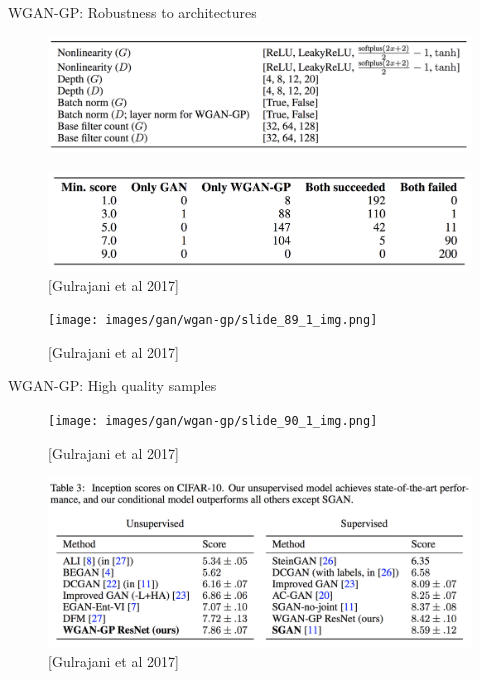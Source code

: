 \begin{frame}[allowframebreaks]{WGAN-GP: Robustness to architectures}
    \begin{figure}
        \centering
        \includegraphics[height=0.8\textheight, width=1.05\textwidth, keepaspectratio]{images/gan/wgan-gp/slide_88_1_img.png}
    \end{figure}
    \begin{figure}
        \centering
        \includegraphics[height=0.8\textheight, width=1.05\textwidth, keepaspectratio]{images/gan/wgan-gp/slide_88_2_img.png}
        \caption*{[Gulrajani et al 2017]}
    \end{figure}

    \framebreak

    \begin{figure}
        \centering
        \texttt{[image: images/gan/wgan-gp/slide\_89\_1\_img.png]}
        \caption*{[Gulrajani et al 2017]}
    \end{figure}
\end{frame}


\begin{frame}[allowframebreaks]{WGAN-GP: High quality samples}
    \begin{figure}
        \centering
        \texttt{[image: images/gan/wgan-gp/slide\_90\_1\_img.png]}
        \caption*{[Gulrajani et al 2017]}
    \end{figure}

    \framebreak

    \begin{figure}
        \centering
        \includegraphics[height=0.8\textheight, width=1.05\textwidth, keepaspectratio]{images/gan/wgan-gp/slide_91_1_img.png}
        \caption*{[Gulrajani et al 2017]}
    \end{figure}
\end{frame}